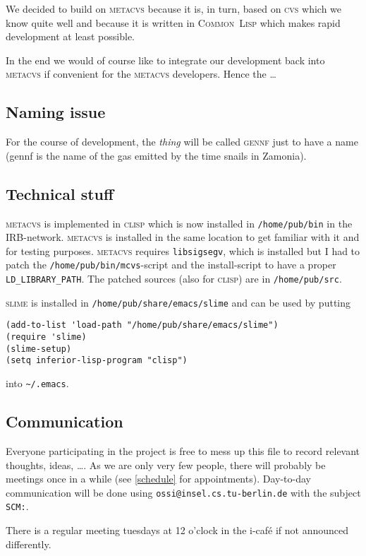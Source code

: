 \documentclass[fleqn, german, 10pt, a4paper]{article}
\begin{document}
We decided to build on \textsc{metacvs} because it is, in turn, based on
\textsc{cvs} which we know quite well and because it is written in
\textsc{Common~Lisp} which makes rapid development at least possible.

In the end we would of course like to integrate our development back
into \textsc{metacvs} if convenient for the \textsc{metacvs} developers.
Hence the \ldots

\subsection{Naming issue}
For the course of development, the \emph{thing} will be called
\textsc{gennf} just to have a name (gennf is the name of the gas emitted
by the time snails in Zamonia).

\subsection{Technical stuff}
\textsc{metacvs} is implemented in \textsc{clisp} which is now installed
in \texttt{/home/pub/bin} in the IRB-network. \textsc{metacvs} is
installed in the same location to get familiar with it and for testing
purposes. \textsc{metacvs} requires \texttt{libsigsegv}, which is
installed but I had to patch the \texttt{/home/pub/bin/mcvs}-script and
the install-script to have a proper \texttt{LD\_LIBRARY\_PATH}. The
patched sources (also for \textsc{clisp}) are in \texttt{/home/pub/src}.

\textsc{slime} is installed in \texttt{/home/pub/share/emacs/slime} and
can be used by putting
\begin{verbatim}
(add-to-list 'load-path "/home/pub/share/emacs/slime")
(require 'slime)
(slime-setup)
(setq inferior-lisp-program "clisp")
\end{verbatim}

into \texttt{\textasciitilde/.emacs}.

\subsection{Communication}
Everyone participating in the project is free to mess up this file to
record relevant thoughts, ideas, \ldots.
As we are only very few people, there will probably be meetings once in
a while (see \ref{schedule} for appointments).
Day-to-day communication will be done using
\texttt{ossi@insel.cs.tu-berlin.de} with the subject \texttt{SCM:}.

There is a regular meeting tuesdays at 12 o'clock in the i-caf\'e if
not announced differently.
\end{document}
